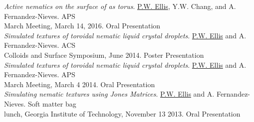 \documentclass[10pt]{article}
\newenvironment{changemargin}[2]{%
  \list{}{\rightmargin#2\leftmargin#1
    \parsep=0pt\topsep=1pt\partopsep=0pt}
\item[]} {\endlist}
\newenvironment{indentmore}{\begin{changemargin}{10pt}{0cm}}{\end{changemargin}}
\begin{document}
\begin{indentmore}
\emph{Active nematics on the surface of as torus}. \underline{P.W. Ellis}, Y.W. Chang, and A. Fernandez-Nieves. APS\\ \hspace*{15pt} March Meeting, March 14, 2016. Oral Presentation\\

\emph{Simulated textures of toroidal nematic liquid crystal droplets}. \underline{P.W. Ellis} and A. Fernandez-Nieves. ACS\\ \hspace*{15pt} Colloids and Surface Symposium, June 2014. Poster Presentation\\

\emph{Simulated textures of toroidal nematic liquid crystal droplets}. \underline{P.W. Ellis} and A. Fernandez-Nieves. APS\\ \hspace*{15pt} March Meeting, March 4 2014. Oral Presentation\\

\emph{Simulating nematic textures using Jones Matrices}. \underline{P.W. Ellis} and A. Fernandez-Nieves. Soft matter bag\\ \hspace*{15pt} lunch, Georgia Institute of Technology, November 13 2013. Oral Presentation\\
\end{indentmore}


\end{document}
